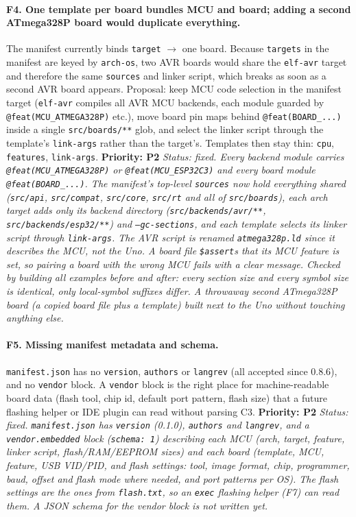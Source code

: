 \documentclass[11pt,a4paper]{article}
\newcommand{\pkg}[1]{\texttt{#1}}
\newcommand{\prio}[1]{\textbf{Priority: #1}}
\begin{document}
\paragraph{F4. One template per board bundles MCU and board; adding a second ATmega328P board
would duplicate everything.}
The manifest currently binds \pkg{target} $\rightarrow$ one board. Because \pkg{targets} in the
manifest are keyed by \pkg{arch-os}, two AVR boards would share the \pkg{elf-avr} target and
therefore the same \pkg{sources} and linker script, which breaks as soon as a second AVR board
appears. Proposal: keep MCU code selection in the manifest target (\pkg{elf-avr} compiles all
AVR MCU backends, each module guarded by \pkg{@feat(MCU\_ATMEGA328P)} etc.), move board pin maps
behind \pkg{@feat(BOARD\_...)} inside a single \pkg{src/boards/**} glob, and select the linker script
through the template's \pkg{link-args} rather than the target's. Templates then stay thin:
\pkg{cpu}, \pkg{features}, \pkg{link-args}. \prio{P2}
\textit{Status: fixed. Every backend module carries \pkg{@feat(MCU\_ATMEGA328P)} or \pkg{@feat(MCU\_ESP32C3)} and every board module \pkg{@feat(BOARD\_...)}. The manifest's top-level \pkg{sources} now hold everything shared (\pkg{src/api}, \pkg{src/compat}, \pkg{src/core}, \pkg{src/rt} and all of \pkg{src/boards}), each arch target adds only its backend directory (\pkg{src/backends/avr/**}, \pkg{src/backends/esp32/**}) and \pkg{--gc-sections}, and each template selects its linker script through \pkg{link-args}. The AVR script is renamed \pkg{atmega328p.ld} since it describes the MCU, not the Uno. A board file \pkg{\$assert}s that its MCU feature is set, so pairing a board with the wrong MCU fails with a clear message. Checked by building all examples before and after: every section size and every symbol size is identical, only local-symbol suffixes differ. A throwaway second ATmega328P board (a copied board file plus a template) built next to the Uno without touching anything else.}

\paragraph{F5. Missing manifest metadata and schema.}
\pkg{manifest.json} has no \pkg{version}, \pkg{authors} or \pkg{langrev} (all accepted since 0.8.6),
and no \pkg{vendor} block. A \pkg{vendor} block is the right place for machine-readable
board data (flash tool, chip id, default port pattern, flash size) that a future flashing helper
or IDE plugin can read without parsing C3. \prio{P2}
\textit{Status: fixed. \pkg{manifest.json} has \pkg{version} (0.1.0), \pkg{authors} and \pkg{langrev}, and a \pkg{vendor.embedded} block (\pkg{schema: 1}) describing each MCU (arch, target, feature, linker script, flash/RAM/EEPROM sizes) and each board (template, MCU, feature, USB VID/PID, and flash settings: tool, image format, chip, programmer, baud, offset and flash mode where needed, and port patterns per OS). The flash settings are the ones from \pkg{flash.txt}, so an \pkg{exec} flashing helper (F7) can read them. A JSON schema for the vendor block is not written yet.}
\end{document}
